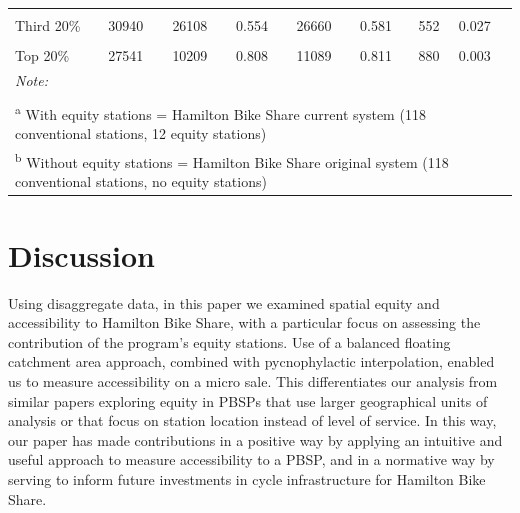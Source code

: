 \documentclass[]{elsarticle} %
\begin{document}
\begin{table}
{\begin{tabular}[t]{lccccccl}
\hspace{1em}\cellcolor{gray!6}{Second 20\%} & \cellcolor{gray!6}{33312} & \cellcolor{gray!6}{30507} & \cellcolor{gray!6}{0.555} & \cellcolor{gray!6}{31069} & \cellcolor{gray!6}{0.614} & \cellcolor{gray!6}{562} & \cellcolor{gray!6}{0.059}\\
\hspace{1em}Third 20\% & 30940 & 26108 & 0.554 & 26660 & 0.581 & 552 & 0.027\\
\hspace{1em}\cellcolor{gray!6}{Fourth 20\%} & \cellcolor{gray!6}{20185} & \cellcolor{gray!6}{6312} & \cellcolor{gray!6}{0.093} & \cellcolor{gray!6}{7435} & \cellcolor{gray!6}{0.096} & \cellcolor{gray!6}{1123} & \cellcolor{gray!6}{0.003}\\
\hspace{1em}Top 20\% & 27541 & 10209 & 0.808 & 11089 & 0.811 & 880 & 0.003\\
\bottomrule
\multicolumn{8}{l}{\rule{0pt}{1em}\textit{Note: }}\\
\multicolumn{8}{l}{\rule{0pt}{1em} }\\
\multicolumn{8}{l}{\rule{0pt}{1em}\textsuperscript{a} With equity stations = Hamilton Bike Share current system (118 conventional stations, 12 equity stations)}\\
\multicolumn{8}{l}{\rule{0pt}{1em}\textsuperscript{b} Without equity stations = Hamilton Bike Share original system (118 conventional stations, no equity stations)}\\
\end{tabular}}
\end{table}

\hypertarget{discussion}{%
\section{Discussion}\label{discussion}}

Using disaggregate data, in this paper we examined spatial equity and
accessibility to Hamilton Bike Share, with a particular focus on
assessing the contribution of the program's equity stations. Use of a
balanced floating catchment area approach, combined with pycnophylactic
interpolation, enabled us to measure accessibility on a micro sale. This
differentiates our analysis from similar papers exploring equity in
PBSPs that use larger geographical units of analysis or that focus on
station location instead of level of service. In this way, our paper has
made contributions in a positive way by applying an intuitive and useful
approach to measure accessibility to a PBSP, and in a normative way by
serving to inform future investments in cycle infrastructure for
Hamilton Bike Share.
\end{document}
